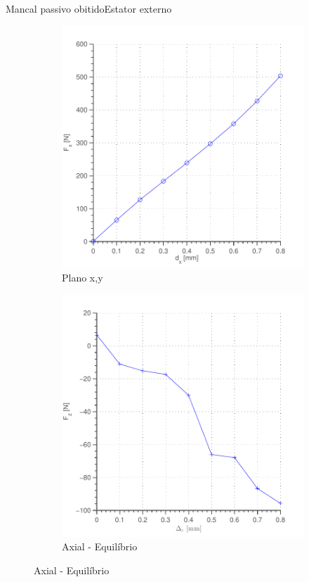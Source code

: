 \documentclass{beamer}
\begin{document}
\begin{frame}{Mancal passivo obitido}{Estator externo}
\begin{figure}
\begin{subfigure}{.5\textwidth}
	\includegraphics[width=1\linewidth]{Simulacoes/Passivo2/fem/passivo_otimizado_fem_dx}
	\caption{Plano x,y}
\end{subfigure}%
\begin{subfigure}{.5\textwidth}	
	\includegraphics[width=1 \linewidth,angle=0]{Simulacoes/Passivo2/fem/passivo_otimizado_fem_dy}
	\caption*{Axial - Equilíbrio}
\end{subfigure}%

\end{figure}
\end{frame}
\end{document}
